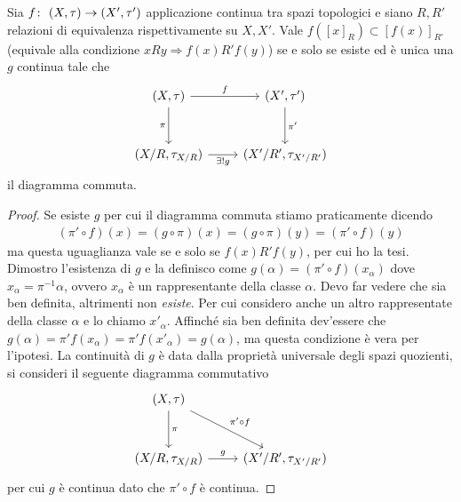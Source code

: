 \begin{lemma}
	\label{lem_qdom}
	Sia $f \colon\ (X, \tau) \rightarrow (X', \tau')$ applicazione continua tra spazi topologici e siano $R, R'$ relazioni di equivalenza rispettivamente su $X, X'$. Vale $f(\left[x\right]_R) \subset \left[f(x)\right]_{R'}$ (equivale alla condizione $xRy \Rightarrow f(x)R'f(y)$) se e solo se esiste ed è unica una $g$ continua tale che 
	\begin{equation}
	\begin{tikzcd}[row sep = 3em]
		(X, \tau) \arrow[swap]{d}{\pi} \arrow{r}{f} & (X', \tau') \arrow{d}{\pi'}\\
		(X/R, \tau_{X/R}) \arrow[swap]{r}{\exists! g} & (X'/R', \tau_{X'/R'})
	\end{tikzcd}
	\end{equation} 	
	il diagramma commuta.
\end{lemma}
\begin{proof}
	Se esiste $g$ per cui il diagramma commuta stiamo praticamente dicendo 
	\begin{equation}
	\begin{aligned}
		(\pi' \circ f)(x) = (g \circ \pi)(x) = (g \circ \pi)(y) = (\pi' \circ f)(y)
	\end{aligned}
	\end{equation}
	ma questa uguaglianza vale se e solo se $f(x) R' f(y)$, per cui ho la tesi.\\
	
	Dimostro l'esistenza di $g$ e la definisco come $g(\alpha) = (\pi' \circ f)(x_\alpha)$ dove $x_\alpha = \pi^{-1}\alpha$, ovvero $x_\alpha$ è un rappresentante della classe $\alpha$. Devo far vedere che sia ben definita, altrimenti non \textit{esiste}.
	Per cui considero anche un altro rappresentate della classe $\alpha$ e lo chiamo $x'_\alpha$. Affinché sia ben definita dev'essere che $g(\alpha) = \pi'f(x_\alpha) = \pi' f(x'_\alpha) = g(\alpha)$, ma questa condizione è vera per l'ipotesi. La continuità di $g$ è data dalla proprietà universale degli spazi quozienti, si consideri il seguente diagramma commutativo
	\begin{equation}
		\begin{tikzcd}[row sep = 3em]
			(X,\tau) \arrow{d}{\pi} \arrow{rd}{\pi' \circ f} & \\
			(X/R, \tau_{X/R}) \arrow{r}{g} & (X'/R', \tau_{X'/R'})
		\end{tikzcd}
	\end{equation}
	per cui $g$ è continua dato che $\pi' \circ f$ è continua.
\end{proof}


